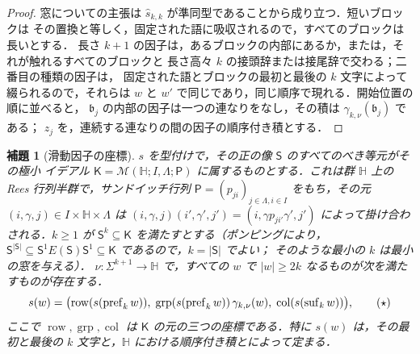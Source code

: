 \documentclass[11pt,a4paper]{ltjsarticle}
\numberwithin{equation}{section}
\theoremstyle{plain}
\newtheorem{lemma}[theorem]{補題}
\theoremstyle{definition}
\theoremstyle{remark}
\theoremstyle{plain}
\begin{document}
\begin{proof}
窓についての主張は $\widehat s_{k,k}$ が準同型であることから成り立つ．短いブロックは
その置換と等しく，固定された語に吸収されるので，すべてのブロックは長いとする．
長さ $k+1$ の因子は，あるブロックの内部にあるか，または，それが触れるすべてのブロックと
長さ高々 $k$ の接頭辞または接尾辞で交わる；二番目の種類の因子は，
固定された語とブロックの最初と最後の $k$ 文字によって綴られるので，それらは
$w$ と $w'$ で同じであり，同じ順序で現れる．開始位置の順に並べると，
$\mathfrak b_j$ の内部の因子は一つの連なりをなし，その積は $\gamma_{k,\nu}(\mathfrak b_j)$ である；
$z_j$ を，連続する連なりの間の因子の順序付き積とする．
\end{proof}

\begin{lemma}[滑動因子の座標]
\label{lem:lg-rees-window-coordinate}
$s$ を型付けで，その正の像 $\mathsf S$ のすべてのべき等元がその極小
イデアル $\mathsf K=\mathcal M({\mathbb H};I,\Lambda;\mathsf P)$ に属するものとする．これは群
${\mathbb H}$ 上の Rees 行列半群で，サンドイッチ行列 $\mathsf P=(p_{ji})_{j\in\Lambda,i\in I}$ をもち，その元
$(i,\gamma,j)\in I\times{\mathbb H}\times\Lambda$ は
$(i,\gamma,j)(i',\gamma',j')=(i,\gamma p_{ji'}\gamma',j')$ によって掛け合わされる．$k\ge1$ が
$\mathsf S^k\subseteq\mathsf K$ を満たすとする（ポンピングにより，
$\mathsf S^{|\mathsf S|}\subseteq\mathsf S^1E(\mathsf S)\mathsf S^1\subseteq\mathsf K$ であるので，$k=|\mathsf S|$ でよい；
そのような最小の $k$ は最小の窓を与える）．
$\nu:\Sigma^{k+1}\to {\mathbb H}$ で，すべての $w$ で $|w|\ge2k$ なるものが次を満たすものが存在する．
\[
 s(w)=\bigl(\operatorname{row}(s(\operatorname{pref}_kw)),\;
 \operatorname{grp}(s(\operatorname{pref}_kw))\,\gamma_{k,\nu}(w),\;
 \operatorname{col}(s(\operatorname{suf}_kw))\bigr),
 \tag{\ensuremath{\star}}
\]
ここで $\operatorname{row},\operatorname{grp},\operatorname{col}$ は
$\mathsf K$ の元の三つの座標である．特に $s(w)$ は，その最初と最後の
$k$ 文字と，${\mathbb H}$ における順序付き積とによって定まる．
\end{lemma}
\end{document}
